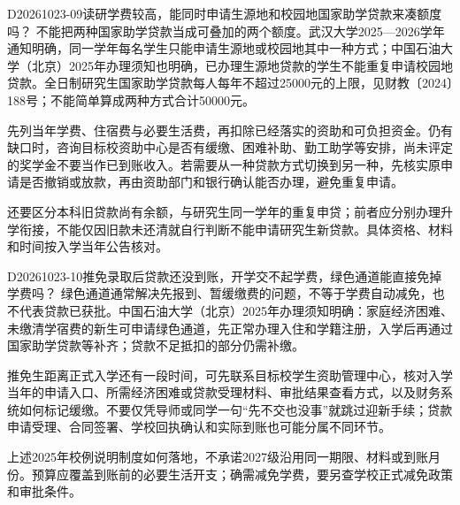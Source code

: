\begin{qa}{D20261023-09}{读研学费较高，能同时申请生源地和校园地国家助学贷款来凑额度吗？}
不能把两种国家助学贷款当成可叠加的两个额度。武汉大学2025—2026学年通知明确，同一学年每名学生只能申请生源地或校园地其中一种方式；中国石油大学（北京）2025年办理须知也明确，已办理生源地贷款的学生不能重复申请校园地贷款。全日制研究生国家助学贷款每人每年不超过25000元的上限，见财教〔2024〕188号；不能简单算成两种方式合计50000元。  

先列当年学费、住宿费与必要生活费，再扣除已经落实的资助和可负担资金。仍有缺口时，咨询目标校资助中心是否有缓缴、困难补助、勤工助学等安排，尚未评定的奖学金不要当作已到账收入。若需要从一种贷款方式切换到另一种，先核实原申请是否撤销或放款，再由资助部门和银行确认能否办理，避免重复申请。

还要区分本科旧贷款尚有余额，与研究生同一学年的重复申贷；前者应分别办理升学衔接，不能仅因旧款未还清就自行判断不能申请研究生新贷款。具体资格、材料和时间按入学当年公告核对。
\end{qa}

\begin{qa}{D20261023-10}{推免录取后贷款还没到账，开学交不起学费，绿色通道能直接免掉学费吗？}
绿色通道通常解决先报到、暂缓缴费的问题，不等于学费自动减免，也不代表贷款已获批。中国石油大学（北京）2025年办理须知明确：家庭经济困难、未缴清学宿费的新生可申请绿色通道，先正常办理入住和学籍注册，入学后再通过国家助学贷款等补齐；贷款不足抵扣的部分仍需补缴。

推免生距离正式入学还有一段时间，可先联系目标校学生资助管理中心，核对入学当年的申请入口、所需经济困难或贷款受理材料、审批结果查看方式，以及财务系统如何标记缓缴。不要仅凭导师或同学一句“先不交也没事”就跳过迎新手续；贷款申请受理、合同签署、学校回执确认和实际到账也可能分属不同环节。 

上述2025年校例说明制度如何落地，不承诺2027级沿用同一期限、材料或到账月份。预算应覆盖到账前的必要生活开支；确需减免学费，要另查学校正式减免政策和审批条件。
\end{qa}

